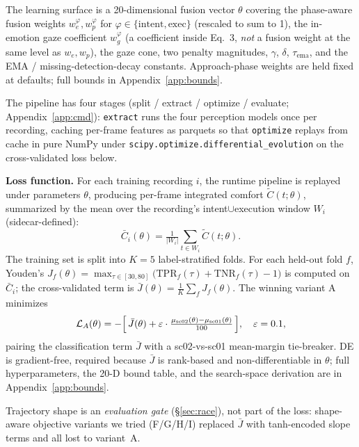 \documentclass{article}
\newcommand{\code}[1]{\texttt{\small #1}}
\begin{document}
The learning surface is a 20-dimensional fusion vector $\theta$ covering the phase-aware fusion weights $w_e^\varphi, w_p^\varphi$ for $\varphi \in \{\text{intent}, \text{exec}\}$ (rescaled to sum to 1), the in-emotion gaze coefficient $w_g^\varphi$ (a coefficient inside Eq.~3, \emph{not} a fusion weight at the same level as $w_e, w_p$), the gaze cone, two penalty magnitudes, $\gamma$, $\delta$, $\tau_\text{ema}$, and the EMA / missing-detection-decay constants. Approach-phase weights are held fixed at defaults; full bounds in Appendix~\ref{app:bounds}.

The pipeline has four stages (split / extract / optimize / evaluate; Appendix~\ref{app:cmd}): \code{extract} runs the four perception models once per recording, caching per-frame features as parquets so that \code{optimize} replays from cache in pure NumPy under \code{scipy.optimize.differential\_evolution} on the cross-validated loss below.

\textbf{Loss function.} For each training recording $i$, the runtime pipeline is replayed under parameters $\theta$, producing per-frame integrated comfort $\tilde{C}(t;\theta)$, summarized by the mean over the recording's intent$\cup$execution window $W_i$ (sidecar-defined):
\begin{equation}
\bar{C}_i(\theta) = \tfrac{1}{|W_i|}\sum_{t \in W_i} \tilde{C}(t;\theta).
\end{equation}
The training set is split into $K=5$ label-stratified folds. For each held-out fold $f$, Youden's $J_f(\theta) = \max_{\tau \in [30, 80]} \bigl(\text{TPR}_f(\tau) + \text{TNR}_f(\tau) - 1\bigr)$ is computed on $\bar{C}_i$; the cross-validated term is $\bar{J}(\theta) = \tfrac{1}{K}\sum_f J_f(\theta)$. The winning variant A minimizes
\begin{equation}
\mathcal{L}_A(\theta) = -\Bigl[\,\bar{J}(\theta) + \varepsilon \cdot \tfrac{\mu_\text{sc02}(\theta) - \mu_\text{sc01}(\theta)}{100}\,\Bigr],\quad \varepsilon = 0.1, \label{eq:loss}
\end{equation}
pairing the classification term $\bar{J}$ with a sc02-vs-sc01 mean-margin tie-breaker. DE is gradient-free, required because $\bar{J}$ is rank-based and non-differentiable in $\theta$; full hyperparameters, the 20-D bound table, and the search-space derivation are in Appendix~\ref{app:bounds}.

Trajectory shape is an \emph{evaluation gate} (\S\ref{sec:race}), not part of the loss: shape-aware objective variants we tried (F/G/H/I) replaced $\bar{J}$ with tanh-encoded slope terms and all lost to variant~A.
\end{document}
